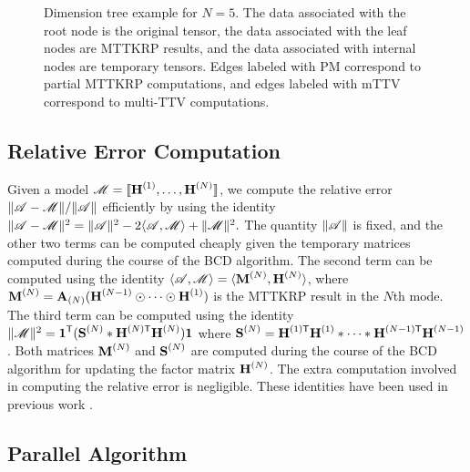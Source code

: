 \begin{figure}

\caption{Dimension tree example for $N=5$. 
The data associated with the root node is the original tensor, the data associated with the leaf nodes are MTTKRP results, and the data associated with internal nodes are temporary tensors.  
Edges labeled with PM correspond to partial MTTKRP computations, and edges labeled with mTTV correspond to multi-TTV computations.}
\label{fig:DT}
\end{figure}

\subsection{Relative Error Computation}
\label{sec:error}

Given a model $\T{M}=\CP$, we compute the relative error $\|\TA - \T{M}\|/\|\TA\|$ efficiently by using the identity $\|\TA-\T{M}\|^2 = \|\TA\|^2 - 2\langle \TA, \T{M} \rangle + \|\T{M}\|^2.$
The quantity $\|\TA\|$ is fixed, and the other two terms can be computed cheaply given the temporary matrices computed during the course of the BCD algorithm.
The second term can be computed using the identity $\langle \TA, \T{M} \rangle = \langle \Mn{M}{N}, \Mn{H}{N} \rangle$, where $\Mn{M}{N} = \Mz{A}{N} (\Mn{H}{N-1} \Khat \cdots \Khat \Mn{H}{1})$ is the MTTKRP result in the $N$th mode.
The third term can be computed using the identity $\|\T{M}\|^2 = \V{1}^\Tra(\Mn{S}{N} \Hada \MnTra{H}{N} \Mn{H}{N})\V{1}$ where $\Mn{S}{N}=\MnTra{H}{1} \Mn{H}{1} \Hada \cdots \Hada \MnTra{H}{N-1} \Mn{H}{N-1}$.
Both matrices $\Mn{M}{N}$ and $\Mn{S}{N}$ are computed during the course of the BCD algorithm for updating the factor matrix $\Mn{H}{N}$.
The extra computation involved in computing the relative error is negligible.
These identities have been used in previous work \cite{KB09,TensorBox,SK16,LKLHS2017}.

\subsection{Parallel Algorithm}

